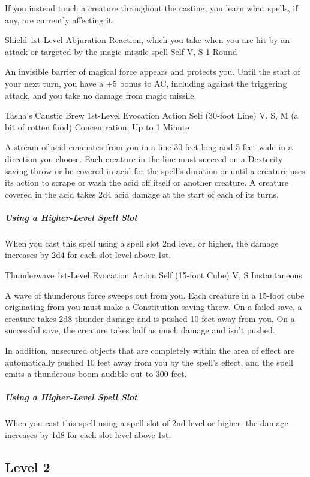 \documentclass[letterpaper,openany,oneside,twocolumn]{book}
\begin{document}
If you instead touch a creature throughout the casting, you learn what spells, if any, are currently affecting it.

\DndSpellHeader
  {Shield}
  {1st-Level Abjuration}
  {Reaction, which you take when you are hit by an attack or targeted by the magic missile spell}
  {Self}
  {V, S}
  {1 Round}

An invisible barrier of magical force appears and protects you. Until the start of your next turn, you have a +5 bonus to AC, including against the triggering attack, and you take no damage from magic missile.

\DndSpellHeader
  {Tasha's Caustic Brew}
  {1st-Level Evocation}
  {Action}
  {Self (30-foot Line)}
  {V, S, M (a bit of rotten food)}
  {Concentration, Up to 1 Minute}

A stream of acid emanates from you in a line 30 feet long and 5 feet wide in a direction you choose. Each creature in the line must succeed on a Dexterity saving throw or be covered in acid for the spell's duration or until a creature uses its action to scrape or wash the acid off itself or another creature. A creature covered in the acid takes 2d4 acid damage at the start of each of its turns.

\subparagraph*{Using a Higher-Level Spell Slot} When you cast this spell using a spell slot 2nd level or higher, the damage increases by 2d4 for each slot level above 1st.

\DndSpellHeader
  {Thunderwave}
  {1st-Level Evocation}
  {Action}
  {Self (15-foot Cube)}
  {V, S}
  {Instantaneous}

A wave of thunderous force sweeps out from you. Each creature in a 15-foot cube originating from you must make a Constitution saving throw. On a failed save, a creature takes 2d8 thunder damage and is pushed 10 feet away from you. On a successful save, the creature takes half as much damage and isn't pushed.

In addition, unsecured objects that are completely within the area of effect are automatically pushed 10 feet away from you by the spell's effect, and the spell emits a thunderous boom audible out to 300 feet.

\subparagraph*{Using a Higher-Level Spell Slot} When you cast this spell using a spell slot of 2nd level or higher, the damage increases by 1d8 for each slot level above 1st.

\subsection*{Level 2}
\end{document}
